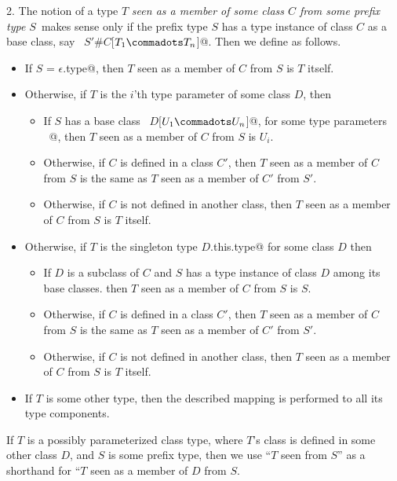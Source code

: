 \documentclass[a4paper,12pt,twoside,titlepage]{book}
\begin{document}
2. The notion of a type $T$
{\em seen as a member of some class $C$ from some prefix type
$S\,$} makes sense only if the prefix type $S$
has a type instance of class $C$ as a base class, say
~\lstinline@$S'$#$C$[$T_1 \commadots T_n$]@. Then we define as follows.
\begin{itemize}
 \item 
  If \lstinline@$S$ = $\epsilon$.type@, then $T$ seen as a member of $C$ from $S$ is $T$ itself.
 \item Otherwise, if $T$ is the $i$'th type parameter of some class $D$, then
   \begin{itemize}
   \item
   If $S$ has a base class ~\lstinline@$D$[$U_1 \commadots U_n$]@, for some type parameters
   ~\lstinline@[$U_1 \commadots U_n$]@, then $T$ seen as a member of $C$ from $S$ is $U_i$.
   \item
   Otherwise, if $C$ is defined in a class $C'$, then
   $T$ seen as a member of $C$ from $S$ is the same as $T$ seen as
   a member of $C'$ from $S'$.
   \item
   Otherwise, if $C$ is not defined in another class, then  
   $T$ seen as a member of $C$ from $S$ is $T$ itself.
  \end{itemize}
\item
   Otherwise, 
   if $T$ is the singleton type \lstinline@$D$.this.type@ for some class $D$
   then
   \begin{itemize}
   \item
   If $D$ is a subclass of $C$ and 
   $S$ has a type instance of class $D$ among its base classes.
   then $T$ seen as a member of $C$ from $S$ is $S$.
   \item
   Otherwise, if $C$ is defined in a class $C'$, then
   $T$ seen as a member of $C$ from $S$ is the same as $T$ seen as
   a member of $C'$ from $S'$.
   \item
   Otherwise, if $C$ is not defined in another class, then  
   $T$ seen as a member of $C$ from $S$ is $T$ itself.
   \end{itemize}
\item
  If $T$ is some other type, then the described mapping is performed
  to all its type components.
\end{itemize}

If $T$ is a possibly parameterized class type, where $T$'s class
is defined in some other class $D$, and $S$ is some prefix type,
then we use ``$T$ seen from $S$'' as a shorthand for
``$T$ seen as a member of $D$ from $S$.
\end{document}
